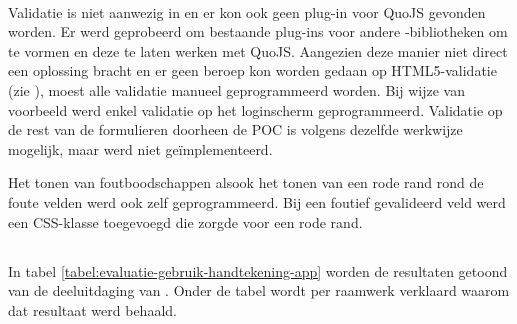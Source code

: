 \paragraph{\lungo}
Validatie is niet aanwezig in \lungo{} en er kon ook geen plug-in voor QuoJS gevonden worden.
Er werd geprobeerd om bestaande plug-ins voor andere \js{}-bibliotheken om te vormen en deze te laten werken met QuoJS.
Aangezien deze manier niet direct een oplossing bracht en er geen beroep kon worden gedaan op HTML5-validatie (zie \jqm{}), moest alle validatie manueel geprogrammeerd worden. 
Bij wijze van voorbeeld werd enkel validatie op het loginscherm geprogrammeerd.
Validatie op de rest van de formulieren doorheen de POC is volgens dezelfde werkwijze mogelijk, maar werd niet geïmplementeerd.

Het tonen van foutboodschappen alsook het tonen van een rode rand rond de foute velden werd ook zelf geprogrammeerd.
Bij een foutief gevalideerd veld werd een CSS-klasse toegevoegd die zorgde voor een rode rand.


\subsection{}
\label{sec:evaluatie-gebruik-handtekening-app}

In tabel \ref{tabel:evaluatie-gebruik-handtekening-app} worden de resultaten getoond van de deeluitdaging van .
Onder de tabel wordt per raamwerk verklaard waarom dat resultaat werd behaald.

\begin{table}[H]
\centering
{}
\caption{Gebruik van  voor \st{}~(\sta), \kendo{}~(\kendoa), \jqm{}~(\jqma) en \lungo{}~(\lungoa).}
\label{tabel:evaluatie-gebruik-handtekening-app}
\end{table}

